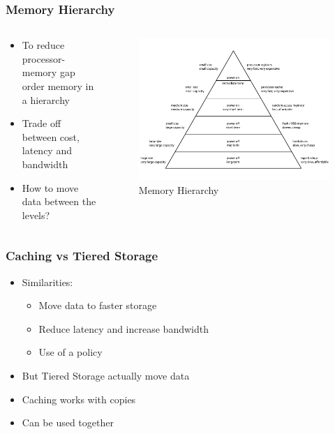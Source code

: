 \documentclass[
	aspectratio=169,
	compress,
]{beamer}
\newcommand{\navframetitle}[1]{\frametitle{#1\hfill{\footnotesize\lastsection{}}}}
\begin{document}
\begin{frame}
	\navframetitle{Memory Hierarchy}

	\begin{columns}
		\begin{column}{0.5\textwidth}
			\begin{itemize}
				\item To reduce processor-memory gap order memory in a hierarchy
				\item Trade off between cost, latency and bandwidth
				\item How to move data between the levels? 
			\end{itemize}
		\end{column}
		\begin{column}{0.5\textwidth}
			\begin{figure}[ht]
    			\centering
    			\includegraphics[scale=0.3]{ComputerMemoryHierarchy.pdf}
    			\caption{Memory Hierarchy \cite{wikiMemoryHierarchy}}
        		\label{fig:memory hierarchy}
			\end{figure}
		\end{column}
	\end{columns}
\end{frame}

\begin{frame}
	\navframetitle{Caching vs Tiered Storage}
	
	\begin{itemize}
		\item Similarities:
		\begin{itemize}
			\item Move data to faster storage 			
			\item Reduce latency and increase bandwidth
			\item Use of a policy  
		\end{itemize}		 
		\item But Tiered Storage actually move data
		\item Caching works with copies 
		\item Can be used together
	\end{itemize}
\end{frame}
\end{document}
